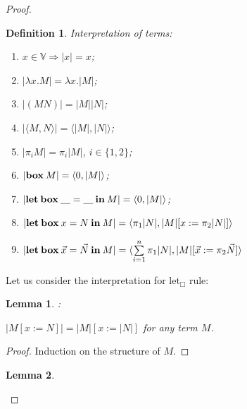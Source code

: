 \documentclass[a4paper]{article}
\newtheorem{lemma}{Lemma}
\newtheorem{defin}{Definition}
\begin{document}
\begin{proof}
  \begin{defin} Interpretation of terms:
    \begin{enumerate}
      \item $x \in \mathbb{V} \Rightarrow |x| = x$;
      \item $|\lambda x. M| = \lambda x. |M|$;
      \item $|(M N)| = |M| |N|$;
      \item $|\langle M, N \rangle| = \langle |M|, |N| \rangle$;
      \item $|\pi_i M| = \pi_i |M|$, $i \in \{ 1, 2\}$;
      \item $|{\bf box \:} M| = \langle 0, |M| \rangle$;
      \item $|{\bf let \: box \:} \underline{\quad} = \underline{\quad} {\: \bf in \:} M| = \langle 0, |M| \rangle$;
      \item $|{\bf let \: box \:} x = N {\: \bf in \:} M| = \langle \pi_1 |N| , |M| [x := \pi_2 |N|] \rangle$
      \item $|{\bf let \: box \:} \vec{x} = \vec{N} {\: \bf in \:} M| = \langle \sum \limits_{i = 1}^n \pi_1 |N|, |M| [\vec{x} := \pi_2 \vec{N}] \rangle$
    \end{enumerate}
  \end{defin}

  Let us consider the interpretation for $\text{let}_{\Box}$ rule:

  \begin{prooftree}
  \end{prooftree}

  \begin{lemma}:

    $|M [x := N]| = |M| [x := |N|]$ for any term $M$.
  \end{lemma}

  \begin{proof}

    Induction on the structure of $M$.
  \end{proof}

  \begin{lemma}


\end{lemma}
\end{proof}
\end{document}
